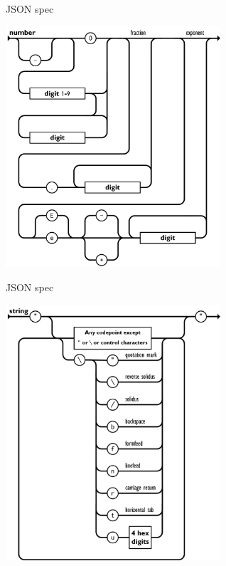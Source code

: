 \documentclass{beamer}
\begin{document}
\begin{frame}[fragile]{JSON spec}
  \begin{center}
    \includegraphics[width=0.6\textwidth]{images/json-number.png}
  \end{center}
\end{frame}

\begin{frame}[fragile]{JSON spec}
  \begin{center}
    \includegraphics[width=0.6\textwidth]{images/json-string.png}
  \end{center}
\end{frame}
\end{document}

